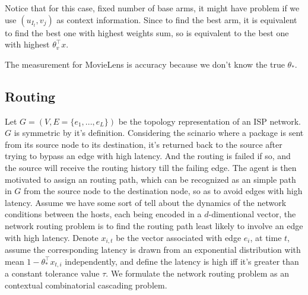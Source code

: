 \documentclass[a4paper,11pt]{article}
\begin{document}
Notice that for this case, fixed number of base arms, it might have problem if we use $(u_{I_t}, v_j)$ as context information.
Since to find the best arm, it is equivalent to find the best one with highest weights sum, so is equivalent to the best one with highest $\theta_{v}^{\top}x$.

The measurement for MovieLens is accuracy because we don't know the true $\theta_{\ast}$.

\subsection{Routing}

Let $G=(V,E=\{e_1,...,e_L\})$ be the topology representation of an ISP network. $G$ is symmetric by it's definition. 
Considering the scinario where a package is sent from its source node to its destination, it's returned back to the source after trying to bypass an edge with high latency.
And the routing is failed if so, and the source will receive the routing history till the failing edge.
The agent is then motivated to assign an routing path, which can be recognized as an simple path in $G$ from the source node to the destination node, so as to avoid edges with high latency. 
Assume we have some sort of tell about the dynamics of the network conditions between the hosts, each being encoded in a $d$-dimentional vector, the network routing problem is to find the routing path least likely to involve an edge with high latency.
Denote $x_{i,t}$ be the vector associated with edge $e_i$, at time $t$, assume the corresponding latency is drawn from an exponential distribution with mean $1 - \theta_{\ast}^{\top}x_{t,i}$ independently,
and define the latency is high iff it's greater than a constant tolerance value $\tau$.
We formulate the network routing problem as an contextual combinatorial cascading problem.
\end{document}
